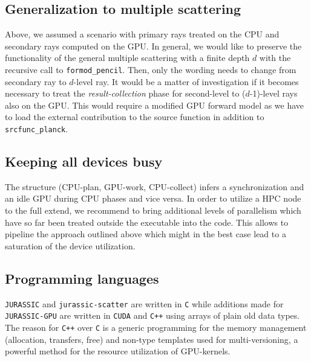 \documentclass[12pt,a4paper,titlepage,twoside]{article}
\newcommand{\ttt}[1]{\texttt{#1}}
\begin{document}
\subsection{Generalization to multiple scattering}
Above, we assumed a scenario with primary rays
treated on the CPU and secondary rays computed on the GPU.
In general, we would like to preserve the functionality
of the general multiple scattering with a finite depth $d$ with the recursive call to \ttt{formod\_pencil}.
Then, only the wording needs to change from secondary ray to $d$-level ray.
It would be a matter of investigation if it becomes necessary to
treat the \emph{result-collection} phase for second-level to ($d$-1)-level rays also on the GPU.
This would require a modified GPU forward model as we have to load the external contribution
to the source function in addition to \ttt{srcfunc\_planck}.

\subsection{Keeping all devices busy}
The structure (CPU-plan, GPU-work, CPU-collect) infers a synchronization and
an idle GPU during CPU phases and vice versa.
In order to utilize a HPC node to the full extend,
we recommend to bring additional levels of parallelism which have so far been
treated outside the executable into the code. This allows to pipeline
the approach outlined above which might in the best case lead to a saturation
of the device utilization.

\subsection{Programming languages}
\ttt{JURASSIC} and \ttt{jurassic-scatter} are written in \ttt{C} while
additions made for \ttt{JURASSIC-GPU} are written in \ttt{CUDA} and \ttt{C++} 
using arrays of plain old data types.
The reason for \ttt{C++} over \ttt{C} is a generic programming for the 
memory management (allocation, transfers, free) and 
non-type templates used for multi-versioning, 
a powerful method for the resource utilization of GPU-kernels.





%
\end{document}
